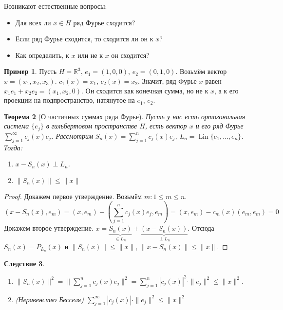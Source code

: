 \documentclass[11pt,openany,a4paper]{scrartcl}
\theoremstyle{plain}
\newtheorem{theorem}{Теорема}[section]
\newtheorem{corollary}[theorem]{Следствие}
\theoremstyle{definition}
\newtheorem{example}[theorem]{Пример}
\newcommand\mb{\mathbb}
\newcommand\real{\mb R}
\DeclareMathOperator{\Lin}{Lin}
\begin{document}
Возникают естественные вопросы:
\begin{itemize}
    \item Для всех ли $x \in H$ ряд Фурье сходится?
    \item Если ряд Фурье сходится, то сходится ли он к $x$?
    \item Как определить, к $x$ или не к $x$ он сходится?
\end{itemize}

\begin{example}\label{fourier_series_bad_example}
    Пусть $H = \real^3$, $e_1 = (1, 0, 0)$, $e_2 = (0, 1, 0)$. Возьмём вектор
$x = (x_1, x_2, x_3)$. $c_1(x) = x_1$, $c_2(x) = x_2$. Значит, ряд Фурье $x$ равен
$x_1e_1 + x_2e_2 = (x_1, x_2, 0)$. Он сходится как конечная сумма, но не к $x$, а
к его проекции на подпространство, натянутое на $e_1$, $e_2$.
\end{example}

\begin{theorem}[О частичных суммах ряда Фурье]
    Пусть у нас есть ортогональная система $\{e_j\}$ в гильбертовом пространстве
    $H$, есть вектор $x$ и его ряд Фурье $\sum\limits_{j=1}^\infty c_j(x)e_j$.
    Рассмотрим $S_n(x) = \sum\limits_{j=1}^n c_j(x)e_j$,
    $L_n = \Lin \{e_1,\ldots,e_n\}$. Тогда:
    \begin{enumerate}
        \item $x - S_n(x) \perp L_n$.
        \item $\|S_n(x)\| \leqslant \|x\|$
    \end{enumerate}
\end{theorem}
\begin{proof}
    Докажем первое утверждение. Возьмём $m: 1 \leqslant m \leqslant n$.
    $$
    (x - S_n(x), e_m) = (x, e_m) - (\sum\limits_{j=1}^n c_j(x)e_j, e_m) =
    (x, e_m) - c_m(x)(e_m, e_m) = 0
    $$
    Докажем второе утверждение. $x = \underbrace{S_n(x)}_{\in L_n} +
    \underbrace{(x - S_n(x))}_{\perp L_n}$. Отсюда $S_n(x) = P_{L_n}(x)$ и
    $\|S_n(x)\|\leqslant \|x\|$, $\|x - S_n(x)\| \leqslant \|x\|$.
\end{proof}
\begin{corollary}
\mbox{}
    \begin{enumerate}
        \item $\|S_n(x)\|^2 = \|\sum\limits_{j=1}^n c_j(x)e_j\|^2 =
        \sum\limits_{j=1}^n |c_j(x)|^2 \cdot \|e_j\|^2 \leqslant \|x\|^2$.
        \item (Неравенство Бесселя)
        $\sum\limits_{j=1}^\infty |c_j(x)|\cdot \|e_j\|^2 \leqslant \|x\|^2$
    \end{enumerate}
\end{corollary}
\end{document}
